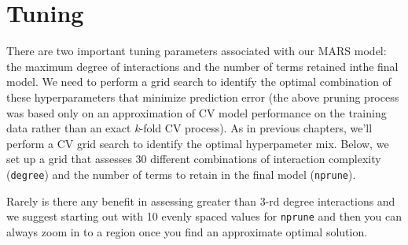 \documentclass[]{krantz}
\makeatletter
\newenvironment{Shaded}{\begin{snugshade}}{\end{snugshade}}
\newcommand{\CommentTok}[1]{\textcolor[rgb]{0.37,0.37,0.37}{\textit{#1}}}
\newcommand{\DataTypeTok}[1]{\textcolor[rgb]{0.27,0.27,0.27}{#1}}
\newcommand{\DecValTok}[1]{\textcolor[rgb]{0.06,0.06,0.06}{#1}}
\newcommand{\KeywordTok}[1]{\textcolor[rgb]{0.27,0.27,0.27}{\textbf{#1}}}
\newcommand{\NormalTok}[1]{#1}
\newcommand{\OperatorTok}[1]{\textcolor[rgb]{0.43,0.43,0.43}{\textbf{#1}}}
\newcommand{\StringTok}[1]{\textcolor[rgb]{0.5,0.5,0.5}{#1}}
\newenvironment{kframe}{%
\medskip{}
\setlength{\fboxsep}{.8em}
 \def\at@end@of@kframe{}%
 \ifinner\ifhmode%
  \def\at@end@of@kframe{\end{minipage}}%
  \begin{minipage}{\columnwidth}%
 \fi\fi%
 \def\FrameCommand##1{\hskip\@totalleftmargin \hskip-\fboxsep
 \colorbox{shadecolor}{##1}\hskip-\fboxsep
     \hskip-\linewidth \hskip-\@totalleftmargin \hskip\columnwidth}%
 \MakeFramed {\advance\hsize-\width
   \@totalleftmargin\z@ \linewidth\hsize
   \@setminipage}}%
 {\par\unskip\endMakeFramed%
 \at@end@of@kframe}
\newenvironment{block}[1]
  {
  \begin{itemize}
  \renewcommand{\labelitemi}{
    \raisebox{-.7\height}[0pt][0pt]{
      {\setkeys{Gin}{width=3em,keepaspectratio}\texttt{[image: icons/\#1]}}
    }
  }
  \setlength{\fboxsep}{1em}
  \begin{kframe}
  \item
  }
  {
  \end{kframe}
  \end{itemize}
  }
\newenvironment{tip}
  {\begin{block}{tip}}
  {\end{block}}
\renewenvironment{Shaded}{\begin{kframe}}{\end{kframe}}
\makeatother
\begin{document}
\begin{Shaded}
\end{Shaded}

\hypertarget{tuning}{%
\section{Tuning}\label{tuning}}

There are two important tuning parameters associated with our MARS model: the maximum degree of interactions and the number of terms retained inthe final model. We need to perform a grid search to identify the optimal combination of these hyperparameters that minimize prediction error (the above pruning process was based only on an approximation of CV model performance on the training data rather than an exact \emph{k}-fold CV process). As in previous chapters, we'll perform a CV grid search to identify the optimal hyperpameter mix. Below, we set up a grid that assesses 30 different combinations of interaction complexity (\texttt{degree}) and the number of terms to retain in the final model (\texttt{nprune}).

\begin{tip}
Rarely is there any benefit in assessing greater than 3-rd degree
interactions and we suggest starting out with 10 evenly spaced values
for \texttt{nprune} and then you can always zoom in to a region once you
find an approximate optimal solution.
\end{tip}
\end{document}
